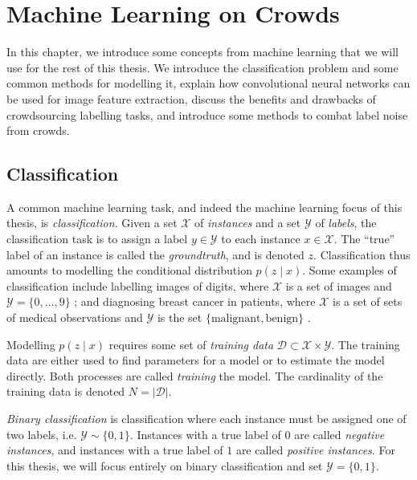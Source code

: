 \chapter{Machine Learning on Crowds}
\label{cha:ml}

In this chapter, we introduce some concepts from machine learning that we will
use for the rest of this thesis. We introduce the classification problem and
some common methods for modelling it, explain how convolutional neural networks
can be used for image feature extraction, discuss the benefits and drawbacks of
crowdsourcing labelling tasks, and introduce some methods to combat label noise
from crowds.

\section{Classification}
\label{sec:classification}

    A common machine learning task, and indeed the machine learning focus of
    this thesis, is \emph{classification}. Given a set $\mathcal X$ of
    \emph{instances} and a set $\mathcal Y$ of \emph{labels}, the classification
    task is to assign a label $y \in \mathcal Y$ to each instance $x \in
    \mathcal X$. The ``true'' label of an instance is called the
    \emph{groundtruth}, and is denoted $z$. Classification thus amounts to
    modelling the conditional distribution $p(z \mid x)$. Some examples of
    classification include labelling images of digits, where $\mathcal X$ is a
    set of images and $\mathcal Y = \{0, \dots, 9\}$ \citep{lecun98}; and
    diagnosing breast cancer in patients, where $\mathcal X$ is a set of sets
    of medical observations and $\mathcal Y$ is the set $\{\text{malignant},
    \text{benign}\}$ \citep{wolberg90}.

    Modelling $p(z \mid x)$ requires some set of \emph{training data} $\mathcal
    D \subset \mathcal X \times \mathcal Y$. The training data are either used
    to find parameters for a model or to estimate the model directly. Both
    processes are called \emph{training} the model. The cardinality of the
    training data is denoted $N = |\mathcal D|$.

    \emph{Binary classification} is classification where each instance must be
    assigned one of two labels, i.e. $\mathcal Y \sim \{0, 1\}$. Instances with
    a true label of $0$ are called \emph{negative instances}, and instances with
    a true label of $1$ are called \emph{positive instances}. For this thesis,
    we will focus entirely on binary classification and set $\mathcal Y = \{0,
    1\}$.

